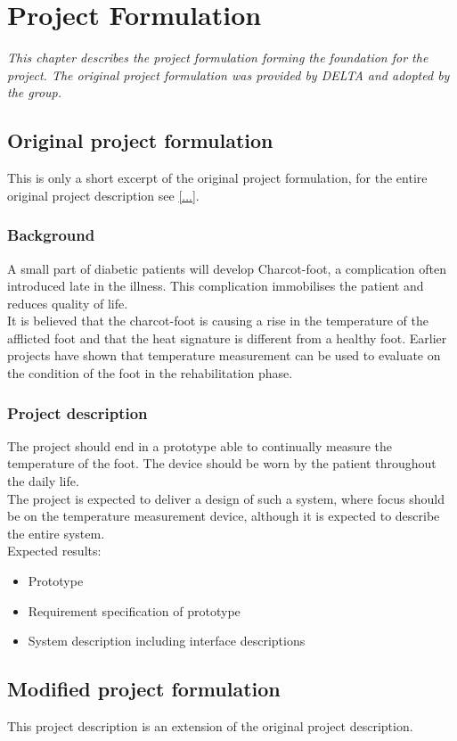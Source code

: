 \chapter{Project Formulation}
\textit{This chapter describes the project formulation forming the foundation for the project. The original project formulation was provided by DELTA and adopted by the group.}
\section{Original project formulation}
This is only a short excerpt of the original project formulation, for the entire original project description see \ref{...}. 
\subsection{Background}
A small part of diabetic patients will develop Charcot-foot, a complication often introduced late in the illness. This complication immobilises the patient and reduces quality of life.\\
It is believed that the charcot-foot is causing a rise in the temperature of the afflicted foot and that the heat signature is different from a healthy foot. Earlier projects have shown that temperature measurement can be used to evaluate on the condition of the foot in the rehabilitation phase.

\subsection{Project description}
The project should end in a prototype able to continually measure the temperature of the foot. The device should be worn by the patient throughout the daily life.\\
The project is expected to deliver a design of such a system, where focus should be on the temperature measurement device, although it is expected to describe the entire system.\\
Expected results:
\begin{itemize}
	\item Prototype
	\item Requirement specification of prototype
	\item System description including interface descriptions
\end{itemize}


\section{Modified project formulation}
This project description is an extension of the original project description. 
